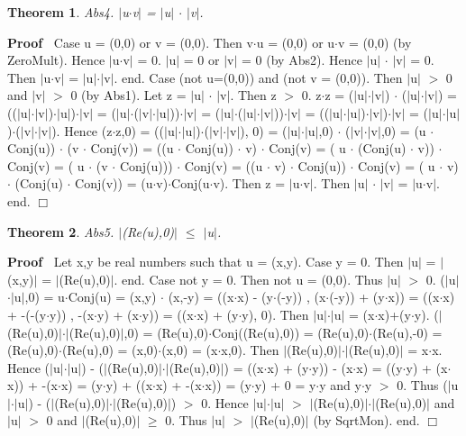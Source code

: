 \documentclass{article}
\newenvironment{forthel}{\begin{leftbar}}{\end{leftbar}}
\newenvironment{proof}{\noindent\textbf{Proof\ }}{\hspace*{\fill}$\Box$\medskip}
\newtheorem{theorem}{Theorem}
\newcommand{\cmul}{\cdot}
\begin{document}
\begin{forthel}
\begin{theorem}
 Abs4. $|$u$\cmul$v$|$ = $|$u$|$ $\cdot$ $|$v$|$.
\end{theorem}\begin{proof}
 	Case u = (0,0) or v = (0,0). Then v$\cmul$u = (0,0) or u$\cmul$v = (0,0) (by ZeroMult). Hence $|$u$\cmul$v$|$ = 0.
$|$u$|$ = 0 or $|$v$|$ = 0 (by Abs2). Hence $|$u$|$ $\cdot$ $|$v$|$ = 0.
Then  $|$u$\cmul$v$|$ = $|$u$|$$\cdot$$|$v$|$. end.
Case (not u=(0,0)) and (not v = (0,0)). Then $|$u$|$ $>$ 0 and $|$v$|$ $>$ 0 (by Abs1). Let z = $|$u$|$ $\cdot$ $|$v$|$. Then z $>$ 0.
z$\cdot$z = ($|$u$|$$\cdot$$|$v$|$) $\cdot$ ($|$u$|$$\cdot$$|$v$|$) = (($|$u$|$$\cdot$$|$v$|$)$\cdot$$|$u$|$)$\cdot$$|$v$|$ = ($|$u$|$$\cdot$($|$v$|$$\cdot$$|$u$|$))$\cdot$$|$v$|$
= ($|$u$|$$\cdot$($|$u$|$$\cdot$$|$v$|$))$\cdot$$|$v$|$ = (($|$u$|$$\cdot$$|$u$|$)$\cdot$$|$v$|$)$\cdot$$|$v$|$ = ($|$u$|$$\cdot$$|$u$|$)$\cdot$($|$v$|$$\cdot$$|$v$|$).
Hence (z$\cdot$z,0)	= (($|$u$|$$\cdot$$|$u$|$)$\cdot$($|$v$|$$\cdot$$|$v$|$), 0) = ($|$u$|$$\cdot$$|$u$|$,0) $\cmul$ ($|$v$|$$\cdot$$|$v$|$,0)
= (u  $\cmul$  Conj(u)) $\cmul$ (v   $\cmul$ Conj(v)) 
= ((u $\cmul$  Conj(u)) $\cmul$  v)  $\cmul$ Conj(v) 
= ( u $\cmul$ (Conj(u)  $\cmul$  v)) $\cmul$ Conj(v) 
= ( u $\cmul$ (v  $\cmul$  Conj(u))) $\cmul$ Conj(v) 
= ((u $\cmul$  v) $\cmul$  Conj(u))  $\cmul$ Conj(v) 
= ( u $\cmul$  v) $\cmul$  (Conj(u)   $\cmul$ Conj(v)) = (u$\cmul$v)$\cmul$Conj(u$\cmul$v).
Then z = $|$u$\cmul$v$|$. Then $|$u$|$ $\cdot$ $|$v$|$ = $|$u$\cmul$v$|$. end.
\end{proof}


\begin{theorem}
 Abs5. $|$(Re(u),0)$|$ $\leq$ $|$u$|$.
\end{theorem}\begin{proof}
 	Let x,y be real numbers such that u = (x,y). 
Case y = 0. Then $|$u$|$ = $|$(x,y)$|$ = $|$(Re(u),0)$|$. end.
Case not y = 0. Then not u = (0,0). Thus $|$u$|$ $>$ 0.
($|$u$|$$\cdot$$|$u$|$,0) = u$\cmul$Conj(u) = (x,y) $\cmul$ (x,-y) = ((x$\cdot$x) - (y$\cdot$(-y)) , (x$\cdot$(-y)) + (y$\cdot$x)) = ((x$\cdot$x) + -(-(y$\cdot$y)) , -(x$\cdot$y) + (x$\cdot$y)) 
= ((x$\cdot$x) + (y$\cdot$y), 0). Then $|$u$|$$\cdot$$|$u$|$ = (x$\cdot$x)+(y$\cdot$y).
($|$(Re(u),0)$|$$\cdot$$|$(Re(u),0)$|$,0) = (Re(u),0)$\cmul$Conj((Re(u),0)) = (Re(u),0)$\cmul$(Re(u),-0) = (Re(u),0)$\cmul$(Re(u),0) = (x,0)$\cmul$(x,0) = (x$\cdot$x,0).
Then $|$(Re(u),0)$|$$\cdot$$|$(Re(u),0)$|$ = x$\cdot$x.
Hence ($|$u$|$$\cdot$$|$u$|$) -  ($|$(Re(u),0)$|$$\cdot$$|$(Re(u),0)$|$) = ((x$\cdot$x) + (y$\cdot$y)) - (x$\cdot$x) = ((y$\cdot$y) + (x$\cdot$x)) + -(x$\cdot$x) = (y$\cdot$y) + ((x$\cdot$x) + -(x$\cdot$x)) = (y$\cdot$y) + 0 = y$\cdot$y and y$\cdot$y $>$ 0.
Thus ($|$u$|$$\cdot$$|$u$|$) -  ($|$(Re(u),0)$|$$\cdot$$|$(Re(u),0)$|$) $>$ 0.
Hence $|$u$|$$\cdot$$|$u$|$ $>$ $|$(Re(u),0)$|$$\cdot$$|$(Re(u),0)$|$ and $|$u$|$ $>$ 0 and $|$(Re(u),0)$|$ $\geq$ 0.
Thus  $|$u$|$ $>$ $|$(Re(u),0)$|$ (by SqrtMon).
end.
\end{proof}



\end{forthel}
\end{document}
